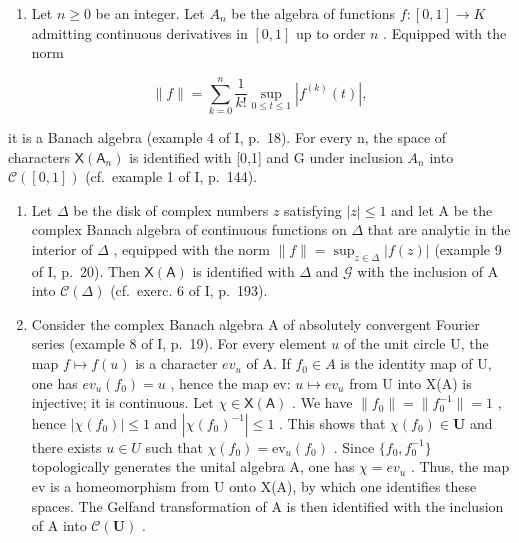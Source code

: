 \begin{enumerate}
\def\labelenumi{\arabic{enumi})}
\setcounter{enumi}{1}
\tightlist
\item
  Let \(n \geqslant 0\) be an integer. Let \(A_n\) be the algebra of functions \(f: [0,1] \to K\) admitting continuous derivatives in \([0,1]\) up to order \(n\) . Equipped with the norm
\end{enumerate}

\[
\| f \| = \sum_ {k = 0} ^ {n} \frac {1}{k !} \sup _ {0 \leqslant t \leqslant 1} | f ^ {(k)} (t) |,
\]

it is a Banach algebra (example 4 of I, p.~18). For every n, the space of characters \(\mathsf{X}(\mathsf{A}_{n})\) is identified with {[}0,1{]} and G under inclusion \(A_{n}\) into \(\mathcal{C}([0,1])\) (cf.~example 1 of I, p.~144).

\begin{enumerate}
\def\labelenumi{\arabic{enumi})}
\setcounter{enumi}{2}
\item
  Let \(\Delta\) be the disk of complex numbers \(z\) satisfying \(|z| \leqslant 1\) and let A be the complex Banach algebra of continuous functions on \(\Delta\) that are analytic in the interior of \(\Delta\) , equipped with the norm \(\|f\| = \sup_{z \in \Delta} |f(z)|\) (example 9 of I, p.~20). Then \(\mathsf{X}(\mathsf{A})\) is identified with \(\Delta\) and \(\mathcal{G}\) with the inclusion of A into \(\mathcal{C}(\Delta)\) (cf.~exerc. 6 of I, p.~193).
\item
  Consider the complex Banach algebra A of absolutely convergent Fourier series (example 8 of I, p.~19). For every element \(u\) of the unit circle U, the map \(f \mapsto f(u)\) is a character \(ev_{u}\) of A. If \(f_{0} \in A\) is the identity map of U, one has \(ev_{u}(f_{0}) = u\) , hence the map ev: \(u \mapsto ev_{u}\) from U into X(A) is injective; it is continuous. Let \(\chi \in \mathsf{X}(\mathsf{A})\) . We have \(\|f_{0}\| = \|f_{0}^{-1}\| = 1\) , hence \(|\chi(f_{0})| \leqslant 1\) and \(|\chi(f_{0})^{-1}| \leqslant 1\) . This shows that \(\chi(f_{0}) \in \mathbf{U}\) and there exists \(u \in U\) such that \(\chi(f_{0}) = \mathrm{ev}_{u}(f_{0})\) . Since \(\{f_{0}, f_{0}^{-1}\}\) topologically generates the unital algebra A, one has \(\chi = ev_{u}\) . Thus, the map ev is a homeomorphism from U onto X(A), by which one identifies these spaces. The Gelfand transformation of A is then identified with the inclusion of A into \(\mathcal{C}(\mathbf{U})\) .
\end{enumerate}

